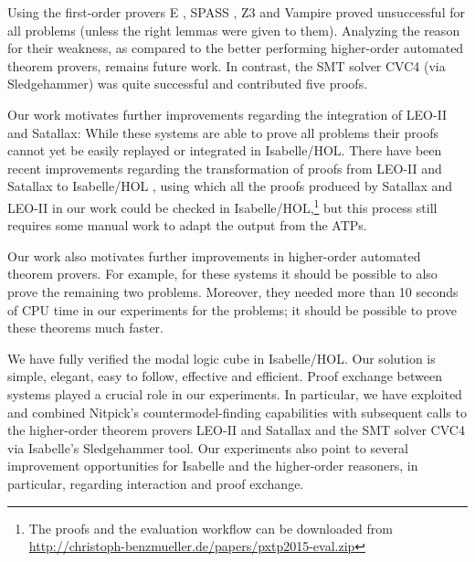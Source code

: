 \begin{isabellebody}
\begin{isamarkuptext}
Using the first-order provers E \cite{E}, SPASS \cite{SPASS}, Z3 \cite{Z3} and Vampire \cite{Vampire} proved unsuccessful for 
all  problems (unless the right lemmas were given to them). Analyzing the reason for their weakness, as compared to the better performing higher-order automated theorem provers,
remains future work. In contrast, the SMT  solver CVC4 (via Sledgehammer) was quite successful 
and contributed five  proofs.


Our work motivates further improvements regarding the integration of LEO-II and Satallax: While these systems
 are able to prove all  problems their proofs cannot yet be easily replayed or integrated 
in Isabelle/HOL. There have been recent improvements regarding the transformation of proofs from LEO-II and Satallax to 
Isabelle/HOL \cite{sultana14:_higher}, using which all the proofs produced by Satallax and LEO-II in
our work could be checked in Isabelle/HOL,\footnote{The proofs and the evaluation workflow can be downloaded from \url{http://christoph-benzmueller.de/papers/pxtp2015-eval.zip}}
but this process still requires some manual work to adapt the output from the ATPs.

Our work also motivates further improvements in higher-order automated theorem provers. For example, for these
systems it should be possible to also prove the remaining two  problems.
Moreover, they needed more than 10 seconds of CPU time in our experiments
for the  problems; it should be possible to prove these theorems much faster.%
\end{isamarkuptext}%
\isamarkuptrue%
%
\isamarkuptrue%
%
\begin{isamarkuptext}%
We have fully verified the modal logic cube in Isabelle/HOL. Our solution is simple, elegant, easy to follow, effective 
and efficient. Proof exchange between systems played a crucial role in our experiments. In particular, we have exploited and combined Nitpick's 
countermodel-finding capabilities with subsequent calls to the higher-order theorem provers LEO-II and Satallax and the SMT solver
CVC4 via Isabelle's Sledgehammer tool. 
Our experiments also point to several improvement opportunities for Isabelle and the higher-order reasoners, in particular, 
regarding interaction and proof exchange.


\end{isamarkuptext}
\end{isabellebody}
